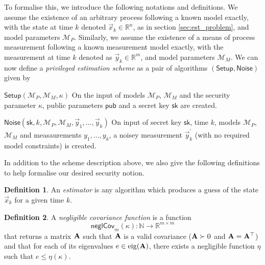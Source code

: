 \documentclass[conference]{IEEEtran}
\theoremstyle{definition}
\newtheorem{definition}{Definition}[section]
\theoremstyle{definition}
\theoremstyle{remark}
\begin{document}
To formalise this, we introduce the following notations and definitions. We assume the existence of an arbitrary process following a known model exactly, with the state at time $k$ denoted $\vec{x}_k\in\mathbb{R}^n$, as in section \ref{sec:est_problem}, and model parameters $\mathcal{M}_P$. Similarly, we assume the existence of a means of process measurement following a known measurement model exactly, with the measurement at time $k$ denoted as $\vec{y}_k\in\mathbb{R}^m$, and model parameters $\mathcal{M}_M$. We can now define a \textit{privileged estimation scheme} as a pair of algorithms $(\mathsf{Setup},\mathsf{Noise})$ given by
\begin{LaTeXdescription}
   \item[$\mathsf{Setup}(\mathcal{M}_P, \mathcal{M}_M, \kappa)$] On the input of models $\mathcal{M}_P$, $\mathcal{M}_M$ and the security parameter $\kappa$, public parameters $\mathsf{pub}$ and a secret key $\mathsf{sk}$ are created.
   \item[$\mathsf{Noise}(\mathsf{sk}, k, \mathcal{M}_P, \mathcal{M}_M, \vec{y}_1, \dots, \vec{y}_k)$] On input of secret key $\mathsf{sk}$, time $k$, models $\mathcal{M}_P$, $\mathcal{M}_M$ and measaurements $y_1,\dots,y_k$, a noisey measurement $\vec{y}^\prime_k$ (with no required model constraints) is created.
\end{LaTeXdescription}
In addition to the scheme description above, we also give the following definitions to help formalise our desired security notion.
\begin{definition}\label{def:estimator}
   An \textit{estimator} is any algorithm which produces a guess of the state $\vec{x}_k$ for a given time $k$.
\end{definition}
\begin{definition}
   A \textit{negligible covariance function} is a function 
   \begin{equation}
      \mathsf{neglCov}_m(\kappa):\mathbb{N}\rightarrow \mathbb{R}^{m\times m}
   \end{equation}
   that returns a matrix ${{\mathbf{A}}}$ such that ${{\mathbf{A}}}$ is a valid covariance (${{\mathbf{A}}}\succ 0$ and ${{\mathbf{A}}}={{\mathbf{A}}}^\top$) and that for each of its eigenvalues $e\in\operatorfont{eig}(\mat{A})$, there exists a negligible function $\eta$ such that $e\leq\eta(\kappa)$.
\end{definition}
\end{document}
